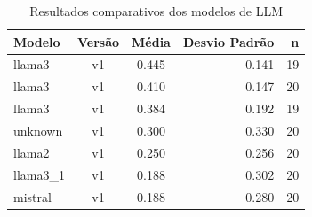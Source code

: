 \begin{table}
\caption{Resultados comparativos dos modelos de LLM}
\label{tab:resultados_modelos}
\begin{tabular}{lccrr}
\toprule
Modelo & Versão & Média & Desvio Padrão & n \\
\midrule
llama3 & v1 & 0.445 & 0.141 & 19 \\
llama3 & v1 & 0.410 & 0.147 & 20 \\
llama3 & v1 & 0.384 & 0.192 & 19 \\
unknown & v1 & 0.300 & 0.330 & 20 \\
llama2 & v1 & 0.250 & 0.256 & 20 \\
llama3_1 & v1 & 0.188 & 0.302 & 20 \\
mistral & v1 & 0.188 & 0.280 & 20 \\
\bottomrule
\end{tabular}
\end{table}
